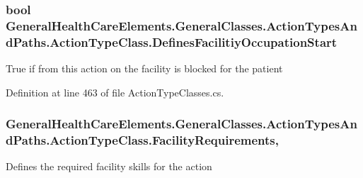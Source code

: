 \subsubsection[{\texorpdfstring{Defines\+Facilitiy\+Occupation\+Start}{DefinesFacilitiyOccupationStart}}]{\setlength{\rightskip}{0pt plus 5cm}bool General\+Health\+Care\+Elements.\+General\+Classes.\+Action\+Types\+And\+Paths.\+Action\+Type\+Class.\+Defines\+Facilitiy\+Occupation\+Start\hspace{0.3cm}{\ttfamily [get]}}\hypertarget{class_general_health_care_elements_1_1_general_classes_1_1_action_types_and_paths_1_1_action_type_class_a59f1669b15c20d7d0b2f9b626a5ae54a}{}\label{class_general_health_care_elements_1_1_general_classes_1_1_action_types_and_paths_1_1_action_type_class_a59f1669b15c20d7d0b2f9b626a5ae54a}


True if from this action on the facility is blocked for the patient 



Definition at line 463 of file Action\+Type\+Classes.\+cs.

\subsubsection[{\texorpdfstring{Facility\+Requirements}{FacilityRequirements}}]{ General\+Health\+Care\+Elements.\+General\+Classes.\+Action\+Types\+And\+Paths.\+Action\+Type\+Class.\+Facility\+Requirements\hspace{0.3cm}{\ttfamily [get]}, {\ttfamily [set]}}\hypertarget{class_general_health_care_elements_1_1_general_classes_1_1_action_types_and_paths_1_1_action_type_class_a8e59bd48f8529ead482692df094f191a}{}\label{class_general_health_care_elements_1_1_general_classes_1_1_action_types_and_paths_1_1_action_type_class_a8e59bd48f8529ead482692df094f191a}


Defines the required facility skills for the action 



